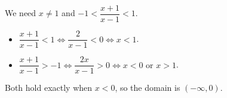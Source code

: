 We need $x\ne1$ and $-1<\dfrac{x+1}{x-1}<1$.
\begin{itemize}
\item $\dfrac{x+1}{x-1}<1\iff\dfrac{2}{x-1}<0\iff x<1$.
\item $\dfrac{x+1}{x-1}>-1\iff\dfrac{2x}{x-1}>0\iff x<0\text{ or }x>1$.
\end{itemize}
Both hold exactly when $x<0$, so the domain is $\boxed{(-\infty,0)}$.
